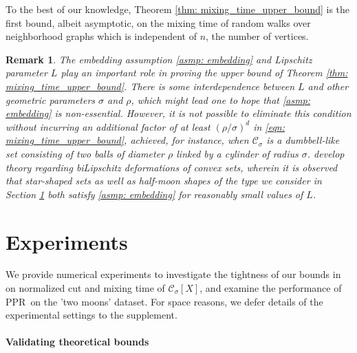 \documentclass{article}
\newcommand{\1}{\mathbf{1}}
\newcommand{\Xbf}{X}             %
\newcommand{\Cset}{\mathcal{C}}
\newcommand{\Csig}{\Cset_{\sigma}}
\newcommand{\pprspace}{{\sc PPR~}}
\theoremstyle{aldenthm}
\theoremstyle{aldenrmrk}
\newtheorem{remark}{Remark}
\begin{document}
To the best of our knowledge, Theorem \ref{thm: mixing_time_upper_bound} is the first bound, albeit asymptotic, on the mixing time of random walks over neighborhood graphs which is independent of $n$, the number of vertices.
\begin{remark}
	The embedding assumption \ref{asmp: embedding} and Lipschitz parameter $L$ play an important role in proving the upper bound of Theorem \ref{thm: mixing_time_upper_bound}. There is some interdependence between $L$ and other geometric parameters $\sigma$ and $\rho$, which might lead one to hope that \ref{asmp: embedding} is non-essential. However, it is not possible to eliminate this condition without incurring an additional factor of at least $(\rho/\sigma)^d$ in \eqref{eqn: mixing_time_upper_bound}, achieved, for instance, when $\Csig$ is a dumbbell-like set consisting of two balls of diameter $\rho$ linked by a cylinder of radius $\sigma$.  \citep{abbasi-yadkori2016, abbasi-yadkori2016a} develop theory regarding biLipschitz deformations of convex sets, wherein it is observed that star-shaped sets as well as half-moon shapes of the type we consider in Section \ref{sec: experiments} both satisfy \ref{asmp: embedding} for reasonably small values of $L$.
\end{remark}

\section{Experiments}
\label{sec: experiments}

We provide numerical experiments to investigate the tightness of our bounds in on normalized cut and mixing time of $\Csig[\Xbf]$, and examine the performance of \pprspace on the 'two moons' dataset. For space reasons, we defer details of the experimental settings to the supplement.

\paragraph{Validating theoretical bounds}
\end{document}
